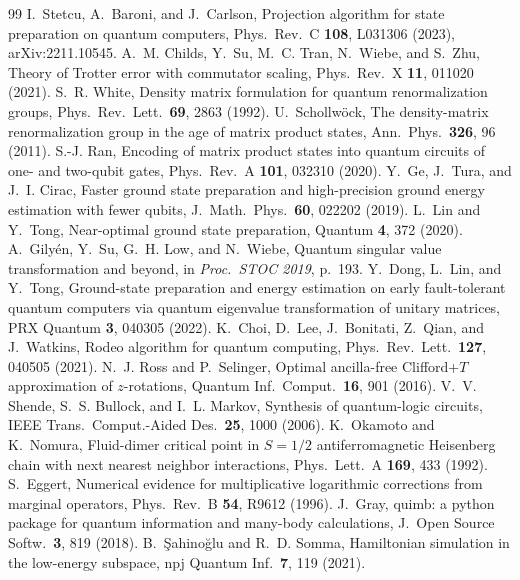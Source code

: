 \documentclass[aps,pra,twocolumn,superscriptaddress,nofootinbib]{revtex4-2}
\begin{document}
\begin{thebibliography}{99}
 I.~Stetcu, A.~Baroni, and J.~Carlson, Projection algorithm for state preparation on
  quantum computers, Phys.\ Rev.\ C \textbf{108}, L031306 (2023), arXiv:2211.10545.
 A.~M. Childs, Y.~Su, M.~C. Tran, N.~Wiebe, and S.~Zhu, Theory of Trotter error with
  commutator scaling, Phys.\ Rev.\ X \textbf{11}, 011020 (2021).
 S.~R. White, Density matrix formulation for quantum renormalization groups,
  Phys.\ Rev.\ Lett.\ \textbf{69}, 2863 (1992).
 U.~Schollw\"ock, The density-matrix renormalization group in the age of matrix
  product states, Ann.\ Phys.\ \textbf{326}, 96 (2011).
 S.-J. Ran, Encoding of matrix product states into quantum circuits of one- and
  two-qubit gates, Phys.\ Rev.\ A \textbf{101}, 032310 (2020).
 Y.~Ge, J.~Tura, and J.~I. Cirac, Faster ground state preparation and high-precision
  ground energy estimation with fewer qubits, J.\ Math.\ Phys.\ \textbf{60}, 022202 (2019).
 L.~Lin and Y.~Tong, Near-optimal ground state preparation, Quantum \textbf{4}, 372
  (2020).
 A.~Gily\'en, Y.~Su, G.~H. Low, and N.~Wiebe, Quantum singular value transformation
  and beyond, in \emph{Proc.\ STOC 2019}, p.~193.
 Y.~Dong, L.~Lin, and Y.~Tong, Ground-state preparation and energy estimation on
  early fault-tolerant quantum computers via quantum eigenvalue transformation of unitary matrices,
  PRX Quantum \textbf{3}, 040305 (2022).
 K.~Choi, D.~Lee, J.~Bonitati, Z.~Qian, and J.~Watkins, Rodeo algorithm for quantum
  computing, Phys.\ Rev.\ Lett.\ \textbf{127}, 040505 (2021).
 N.~J. Ross and P.~Selinger, Optimal ancilla-free Clifford+$T$ approximation of
  $z$-rotations, Quantum Inf.\ Comput.\ \textbf{16}, 901 (2016).
 V.~V. Shende, S.~S. Bullock, and I.~L. Markov, Synthesis of quantum-logic circuits,
  IEEE Trans.\ Comput.-Aided Des.\ \textbf{25}, 1000 (2006).
 K.~Okamoto and K.~Nomura, Fluid-dimer critical point in $S=1/2$ antiferromagnetic
  Heisenberg chain with next nearest neighbor interactions, Phys.\ Lett.\ A \textbf{169}, 433 (1992).
 S.~Eggert, Numerical evidence for multiplicative logarithmic corrections from
  marginal operators, Phys.\ Rev.\ B \textbf{54}, R9612 (1996).
 J.~Gray, quimb: a python package for quantum information and many-body calculations,
  J.\ Open Source Softw.\ \textbf{3}, 819 (2018).
 B.~\c{S}ahino\u{g}lu and R.~D. Somma, Hamiltonian simulation in the low-energy
  subspace, npj Quantum Inf.\ \textbf{7}, 119 (2021).
\end{thebibliography}
\end{document}
